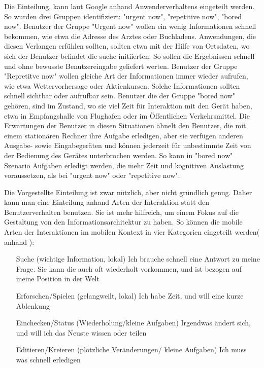 Die Einteilung, kann laut Google anhand Anwenderverhaltens eingeteilt werden. So wurden drei Gruppen identifiziert: "urgent now", "repetitive now", "bored now"\cite{googleUsers}. Benutzer der Gruppe "Urgent now" wollen ein wenig Informationen schnell bekommen, wie etwa die Adresse des Arztes oder Buchladens. Anwendungen, die diesen Verlangen erfühlen sollten, sollten etwa mit der Hilfe von Ortsdaten, wo sich der Benutzer befindet die suche initiierten. So sollen die Ergebnissen schnell und ohne bewusste Benutzereingabe geliefert werten. Benutzer der Gruppe "Repretitve now" wollen gleiche Art der Informationen immer wieder aufrufen, wie etwa Wettervorhersage oder Aktienkursen. Solche Informationen sollten schnell sichtbar oder aufrufbar sein. Benutzer die der Gruppe "bored now" gehören, sind im Zustand, wo sie viel Zeit für Interaktion mit den Gerät haben, etwa in Empfangshalle von Flughafen oder im Öffentlichen Verkehrsmittel. Die Erwartungen der Benutzer in diesen Situationen ähnelt den Benutzer, die mit einem stationären Rechner ihre Aufgabe erledigen, aber sie verfügen anderen Ausgabe- sowie Eingabegeräten und können jederzeit für unbestimmte Zeit von der Bedienung des Gerätes unterbrochen werden. So kann in "bored now" Szenario Aufgaben erledigt werden, die mehr Zeit und kognitiven Auslastung voraussetzen, als bei "urgent now" oder "repetitive now".

Die Vorgestellte Einteilung ist zwar nützlich, aber nicht gründlich genug. Daher kann man eine Einteilung anhand Arten der Interaktion statt den Benutzerverhalten benutzen. Sie ist mehr hilfreich, um einem Fokus auf die Gestaltung von den Informationsarchitektur zu haben. So können die mobile Arten der Interaktionen im mobilen Kontext in vier Kategorien eingeteilt werden( anhand \cite[Seite 50]{mobileFirst}):

\begin{itemize}
 	\item[Suche (wichtige Information, lokal)] Ich brauche schnell eine Antwort zu meine Frage. Sie kann die auch oft wiederholt vorkommen, und ist bezogen auf meine Position in der Welt
 	\item[Erforschen/Spielen (gelangweilt, lokal)] Ich habe Zeit, und will eine kurze Ablenkung
 	\item[Einchecken/Status (Wiederholung/kleine Aufgaben)] Irgendwas ändert sich, und will ich das Neuste wissen oder teilen
 	\item[Editieren/Kreieren (plötzliche Veränderungen/ kleine Aufgaben)] Ich muss was schnell erledigen
 \end{itemize} 

